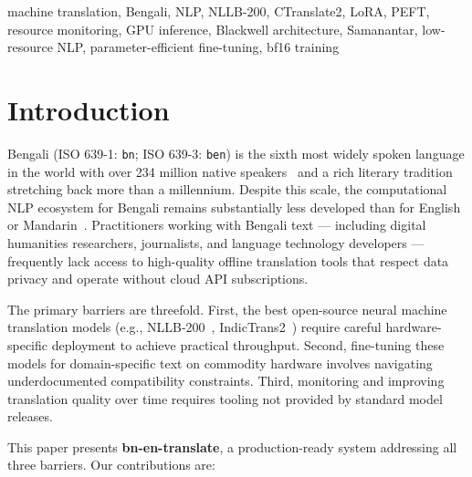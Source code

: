 \documentclass[conference]{IEEEtran}
\begin{document}
\begin{IEEEkeywords}
machine translation, Bengali, NLP, NLLB-200, CTranslate2, LoRA, PEFT, resource
monitoring, GPU inference, Blackwell architecture, Samanantar, low-resource NLP,
parameter-efficient fine-tuning, bf16 training
\end{IEEEkeywords}

\section{Introduction}

Bengali (ISO 639-1: \texttt{bn}; ISO 639-3: \texttt{ben}) is the sixth most widely
spoken language in the world with over 234 million native speakers~\cite{ethnologue2023}
and a rich literary tradition stretching back more than a millennium.
Despite this scale, the computational NLP ecosystem for Bengali remains substantially
less developed than for English or Mandarin~\cite{hasan2020xl}.
Practitioners working with Bengali text --- including digital humanities researchers,
journalists, and language technology developers --- frequently lack access to
high-quality offline translation tools that respect data privacy and operate without
cloud API subscriptions.

The primary barriers are threefold. First, the best open-source neural machine
translation models (e.g., NLLB-200~\cite{nllb2022}, IndicTrans2~\cite{gala2023indictrans2})
require careful hardware-specific deployment to achieve practical throughput.
Second, fine-tuning these models for domain-specific text on commodity hardware
involves navigating underdocumented compatibility constraints.
Third, monitoring and improving translation quality over time requires tooling not
provided by standard model releases.

This paper presents \textbf{bn-en-translate}, a production-ready system addressing all
three barriers. Our contributions are:
\end{document}
